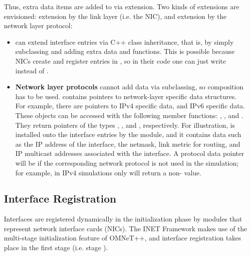 Thus, extra data items are added to  via
extension. Two kinds of extensions are envisioned: extension by the link
layer (i.e. the NIC), and extension by the network layer protocol:

\begin{itemize}

\item {} can extend interface entries via C++ class inheritance, that is, by
simply subclassing  and adding extra data and
functions. This is possible because NICs create and register entries in
, so in their code one can just write
 instead of .

\item \textbf{Network layer protocols} cannot add data via subclassing, so
composition has to be used.  contains pointers to
network-layer specific data structures. For example, there are pointers to
IPv4 specific data, and IPv6 specific data. These objects can be accessed with
the following  member functions: ,
, and .
They return pointers of the types ,
, and ,
respectively. For illustration,  is installed
onto the interface entries by the  module, and it
contains data such as the IP address of the interface, the netmask, link
metric for routing, and IP multicast addresses associated with the
interface. A protocol data pointer will be  if the corresponding
network protocol is not used in the simulation; for example, in IPv4
simulations only  will return a non- value.


\end{itemize}


\subsection{Interface Registration}

Interfaces are registered dynamically in the initialization phase by modules
that represent network interface cards (NICs). The INET Framework makes use
of the multi-stage initialization feature of OMNeT++, and interface registration takes
place in the first stage (i.e. stage ).

